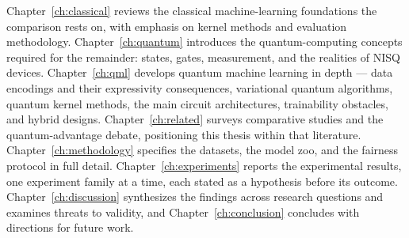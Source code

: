 Chapter~\ref{ch:classical} reviews the classical machine-learning foundations
the comparison rests on, with emphasis on kernel methods and evaluation
methodology. Chapter~\ref{ch:quantum} introduces the quantum-computing
concepts required for the remainder: states, gates, measurement, and the
realities of NISQ devices. Chapter~\ref{ch:qml} develops quantum machine
learning in depth --- data encodings and their expressivity consequences,
variational quantum algorithms, quantum kernel methods, the main circuit
architectures, trainability obstacles, and hybrid designs.
Chapter~\ref{ch:related} surveys comparative studies and the quantum-advantage
debate, positioning this thesis within that literature.
Chapter~\ref{ch:methodology} specifies the datasets, the model zoo, and the
fairness protocol in full detail. Chapter~\ref{ch:experiments} reports the
experimental results, one experiment family at a time, each stated as a
hypothesis before its outcome. Chapter~\ref{ch:discussion} synthesizes the
findings across research questions and examines threats to validity, and
Chapter~\ref{ch:conclusion} concludes with directions for future work.

